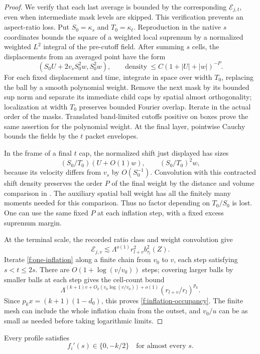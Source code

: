 \begin{proof}
We verify that each last average is bounded by the corresponding
$\mathcal E_{j,t}$, even when intermediate mask levels are skipped. This
verification prevents an aspect-ratio loss. Put $S_0=\kappa_s$ and
$T_0=\kappa_t$. Reproduction in the native $s$ coordinates bounds
the square of a weighted local supremum by a normalized weighted
$L^2$ integral of the pre-cutoff field. After summing $s$ cells,
the displacements from an averaged point have the form
\[
 (S_0U+2v_sS_0^2w,S_0^2w),
 \qquad\text{density}\ \le C(1+|U|+|w|)^{-P}.
\]
For each fixed displacement and time, integrate in space over width
$T_0$, replacing the ball by a smooth polynomial weight. Remove the
next mask by its bounded sup norm and separate its immediate child
caps by spatial almost orthogonality; localization at width $T_0$
preserves bounded Fourier overlap. Iterate in the actual order of
the masks. Translated band-limited cutoffs positive on boxes prove
the same assertion for the polynomial weight. At the final layer,
pointwise Cauchy bounds the fields by the $t$ packet envelopes.

In the frame of a final $t$ cap, the normalized shift just displayed
has sizes
\[
 (S_0/T_0)(U+O(1)w),\qquad(S_0/T_0)^2w,
\]
because its velocity differs from $v_s$ by $O(S_0^{-1})$.
Convolution with this contracted shift density preserves the order
$P$ of the final weight by the distance and volume comparison in
. The auxiliary spatial ball weight has all
the finitely many moments needed for this comparison. Thus no
factor depending on $T_0/S_0$ is lost. One can use the same fixed
$P$ at each inflation step, with a fixed excess supremum margin.

At the terminal scale, the recorded ratio class and weight
convolution give
\[
 \mathcal E_{j,v}\lesssim\Lambda^{o(1)}r_{l+v}^2b_{\tau_l}^2(Z).
\]
Iterate \eqref{f:one-inflation} along a finite chain from $v_0$ to
$v$, each step satisfying $s<t\le2s$. There are
$O(1+\log(v/v_0))$ steps; covering larger balls by smaller balls at
each step gives the cell-count bound
\[
 \Lambda^{(k+1)v+O_k(v_0\log(v/v_0))+o(1)}
                (r_{l+v}/r_l)^{p_k}.
\]
Since $p_kx=(k+1)(1-d_0)$, this proves
\eqref{f:inflation-occupancy}. The finite mesh can include the whole
inflation chain from the outset, and $v_0/u$ can be as small as
needed before taking logarithmic limits.
\end{proof}

\begin{proposition}\label{f:binary}
Every profile satisfies
\begin{equation}\label{f:binary-eq}
 f_i'(s)\in\{0,-k/2\}\quad\text{for almost every }s.
\end{equation}
\end{proposition}

